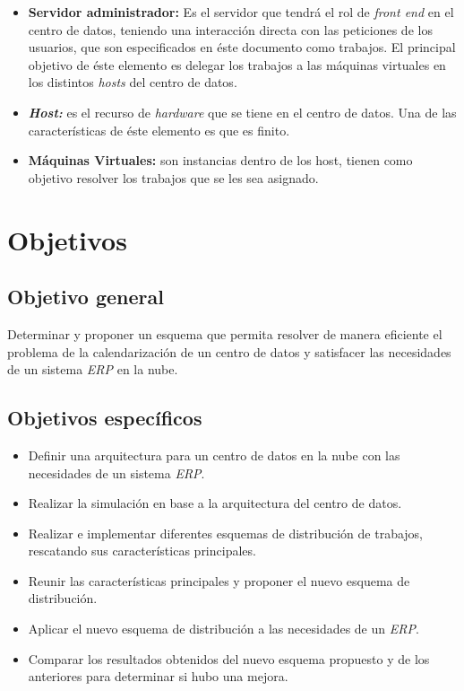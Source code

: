 \begin{itemize}
	\item \textbf{Servidor administrador:} Es el servidor que tendr\'a el rol de \textit{front end} en el centro de datos, teniendo una interacci\'on directa con las peticiones de los usuarios, que son especificados en \'este documento como trabajos.
	El principal objetivo de \'este elemento es delegar los trabajos a las m\'aquinas virtuales en los distintos \textit{hosts} del centro de datos.
	\item \textit{\textbf{Host:}} es el recurso de \textit{hardware} que se tiene en el centro de datos. Una de las caracter\'isticas de \'este elemento es que es finito.
	\item \textbf{M\'aquinas Virtuales:} son instancias dentro de los host, tienen como objetivo resolver los trabajos que se les sea asignado.
\end{itemize}


\newpage

\section*{Objetivos}


\subsection*{Objetivo general}


Determinar y proponer un esquema que permita resolver de manera eficiente el problema de la calendarizaci\'on de un centro de datos y satisfacer las necesidades de un sistema \textit{ERP} en la nube.


\subsection*{Objetivos espec\'ificos}


\begin{itemize}
	\item Definir una arquitectura para un centro de datos en la nube con las necesidades de un sistema \textit{ERP}.
	\item Realizar la simulaci\'on en base a la arquitectura del centro de datos.
	\item Realizar e implementar diferentes esquemas de distribuci\'on de trabajos, rescatando sus caracter\'isticas principales.
	\item Reunir las caracter\'isticas principales y proponer el nuevo esquema de distribuci\'on.
	\item Aplicar el nuevo esquema de distribuci\'on a las necesidades de un \textit{ERP}.
	\item Comparar los resultados obtenidos del nuevo esquema propuesto y de los anteriores para determinar si hubo una mejora.
\end{itemize}


